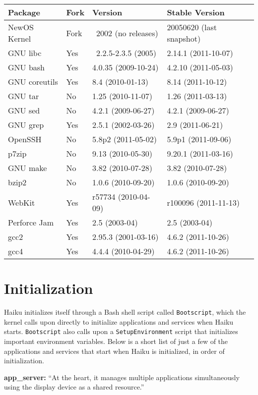 \documentclass{article}
\newcommand{\toprul}{\toprule[1.2pt]}
\newcommand{\tmidrul}{\midrule[1.2pt]}
\newcommand{\bottomrul}{\bottomrule[1.2pt]}
\begin{document}
\begin{tabular}{l l l l}
\toprul
Package & Fork & Version & Stable Version \\
\tmidrul
NewOS Kernel & Fork & ~2002 (no releases) & 20050620 (last snapshot) \\
\midrule
GNU libc & Yes & ~2.2.5-2.3.5 (2005) & 2.14.1 (2011-10-07) \\
\midrule
GNU bash & Yes & 4.0.35 (2009-10-24) & 4.2.10 (2011-05-03) \\
\midrule
GNU coreutils & Yes & 8.4 (2010-01-13) & 8.14 (2011-10-12) \\
\midrule
GNU tar & No & 1.25 (2010-11-07) & 1.26 (2011-03-13) \\
\midrule
GNU sed & No & 4.2.1 (2009-06-27) & 4.2.1 (2009-06-27) \\
\midrule
GNU grep & Yes & 2.5.1 (2002-03-26) & 2.9 (2011-06-21) \\
\midrule
OpenSSH & No & 5.8p2 (2011-05-02) & 5.9p1 (2011-09-06) \\
\midrule
p7zip & No & 9.13 (2010-05-30) & 9.20.1 (2011-03-16) \\
\midrule
GNU make & No & 3.82 (2010-07-28) & 3.82 (2010-07-28) \\
\midrule
bzip2 & No & 1.0.6 (2010-09-20) & 1.0.6 (2010-09-20) \\
\midrule
WebKit & Yes & r57734 (2010-04-09) & r100096 (2011-11-13) \\
\midrule
Perforce Jam & Yes & 2.5 (2003-04) & 2.5 (2003-04) \\
\midrule
gcc2 & Yes & 2.95.3 (2001-03-16) & 4.6.2 (2011-10-26) \\
\midrule
gcc4 & Yes & 4.4.4 (2010-04-29) & 4.6.2 (2011-10-26) \\
\bottomrul
\end{tabular}

\section{Initialization}

Haiku initializes itself through a Bash shell script called \texttt{Bootscript}, which the kernel calls upon directly to initialize applications and services when Haiku starts. \texttt{Bootscript} also calls upon a \texttt{SetupEnvironment} script that initializes important environment variables. Below is a short list of just a few of the applications and services that start when Haiku is initialized, in order of initialization.

\textbf{app\_server:}
``At the heart, it manages multiple applications simultaneously using the display device as a shared resource.''\cite{AppServer}
\end{document}
